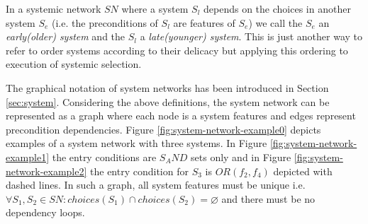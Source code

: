 In a systemic network $SN$ where a system $S_l$ depends on the choices in another system $S_e$ (i.e. the preconditions of $S_l$ are features of $S_e$) we call the $S_e$ an \textit{early(older) system} and the $S_l$ a \textit{late(younger) system}. This is just another way to refer to order systems according to their delicacy but applying this ordering to execution of systemic selection. 

The graphical notation of system networks has been introduced in Section \ref{sec:system}. Considering the above definitions, the system network can be represented as a graph where each node is a system features and edges represent precondition dependencies. Figure \ref{fig:system-network-example0} depicts examples of a system network with three systems. In Figure \ref{fig:system-network-example1} the entry conditions are $S_AND$ sets only and in Figure \ref{fig:system-network-example2} the entry condition for $S_3$ is $OR(f_2,f_4)$ depicted with dashed lines. In such a graph, all system features must be unique i.e. ${\forall S_1, S_2 \in SN: choices(S_1) \cap choices(S_2) = \varnothing}$ and there must be no dependency loops.

